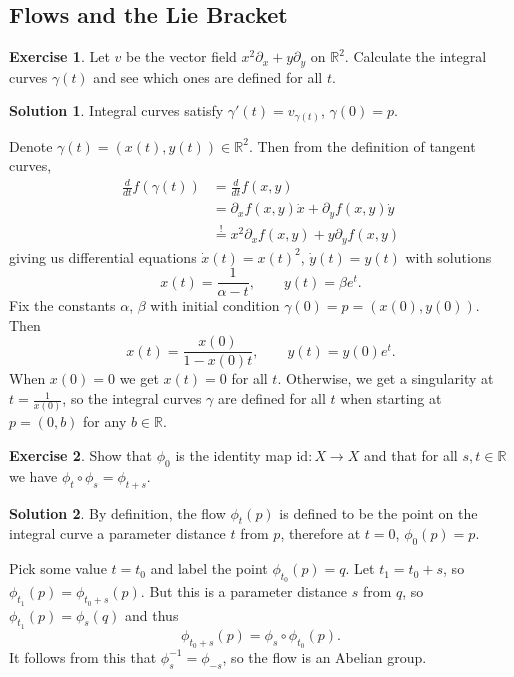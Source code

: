 \documentclass[11pt, a4paper]{article}
\theoremstyle{definition}
\newtheorem{ex}{Exercise}[part]
\newtheorem{sol}{Solution}[part]
\begin{document}
\subsection{Flows and the Lie Bracket}

\begin{ex}

Let $v$ be the vector field $x^2 \partial_x + y \partial_y$ on $\mathbb{R}^2$. Calculate the integral curves $\gamma(t)$ and see which ones are defined for all $t$.

\end{ex}

\begin{sol}

Integral curves satisfy $\gamma'(t) = v_{\gamma(t)}$, $\gamma(0) = p$.

Denote $\gamma(t) = (x(t), y(t)) \in \mathbb{R}^2$. Then from the definition of tangent curves,
\begin{align*}
    \frac{d}{dt} f(\gamma(t)) &= \frac{d}{dt} f(x, y) \\
        &= \partial_x f(x, y) \dot{x} + \partial_y f(x, y) \dot{y} \\
        &\overset{!}{=} x^2 \partial_x f(x, y) + y \partial_y f(x, y)
\end{align*}
giving us differential equations $\dot{x}(t) = {x(t)}^2$, $\dot{y}(t) = y(t)$ with solutions
\[
    x(t) = \frac{1}{\alpha - t}, \qquad
    y(t) = \beta e^t.
\]
Fix the constants $\alpha$, $\beta$ with initial condition $\gamma(0) = p = (x(0), y(0))$. Then
\[
    x(t) = \frac{x(0)}{1 - x(0)t}, \qquad
    y(t) = y(0) e^t.
\]
When $x(0) = 0$ we get $x(t) = 0$ for all $t$. Otherwise, we get a singularity at $t = \frac{1}{x(0)}$, so the integral curves $\gamma$ are defined for all $t$ when starting at $p = (0, b)$ for any $b \in \mathbb{R}$.

\end{sol}

\begin{ex}

Show that $\phi_0$ is the identity map $\text{id}: X \to X$ and that for all $s, t \in \mathbb{R}$ we have $\phi_t \circ \phi_s = \phi_{t + s}$.

\end{ex}

\begin{sol}

By definition, the flow $\phi_t(p)$ is defined to be the point on the integral curve a parameter distance $t$ from $p$, therefore at $t = 0$, $\phi_0(p) = p$.

Pick some value $t = t_0$ and label the point $\phi_{t_0}(p) = q$. Let $t_1 = t_0 + s$, so $\phi_{t_1}(p) = \phi_{t_0 + s}(p)$. But this is a parameter distance $s$ from $q$, so $\phi_{t_1}(p) = \phi_s(q)$ and thus
\[
    \phi_{t_0 + s}(p) = \phi_s \circ \phi_{t_0}(p).
\]
It follows from this that $\phi_s^{-1} = \phi_{-s}$, so the flow is an Abelian group.

\end{sol}
\end{document}
